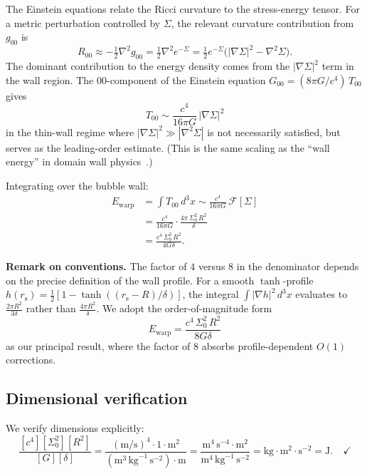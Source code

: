 \documentclass[prd,twocolumn,superscriptaddress,longbibliography]{revtex4-2}
\newcommand{\rs}{r_{\mathrm{s}}}
\newcommand{\Ewarp}{E_{\mathrm{warp}}}
\newcommand{\Fisher}{\mathcal{F}}
\begin{document}
The Einstein equations relate the Ricci curvature to the stress-energy
tensor.  For a metric perturbation controlled by $\Sigma$, the
relevant curvature contribution from $g_{00}$ is~\cite{Wald1984}
\begin{equation}
\label{eq:R00}
R_{00} \approx -\tfrac{1}{2}\nabla^2 g_{00}
= \tfrac{1}{2}\nabla^2 e^{-\Sigma}
= \tfrac{1}{2}e^{-\Sigma}\bigl(|\nabla\Sigma|^2 - \nabla^2\Sigma\bigr).
\end{equation}
The dominant contribution to the energy density comes from the
$|\nabla\Sigma|^2$ term in the wall region.  The $00$-component
of the Einstein equation $G_{00} = (8\pi G/c^4)\,T_{00}$ gives
\begin{equation}
\label{eq:T00}
T_{00} \sim \frac{c^4}{16\pi G}\,|\nabla\Sigma|^2
\end{equation}
in the thin-wall regime where $|\nabla\Sigma|^2 \gg |\nabla^2\Sigma|$
is not necessarily satisfied, but serves as the leading-order estimate.
(This is the same scaling as the ``wall energy'' in domain wall
physics~\cite{Vilenkin2000}.)

Integrating over the bubble wall:
\begin{align}
\Ewarp &= \int T_{00}\,d^3x
\sim \frac{c^4}{16\pi G}\,\Fisher[\Sigma] \nonumber\\
&= \frac{c^4}{16\pi G}\cdot\frac{4\pi\,\Sigma_0^2\,R^2}{\delta}
\nonumber\\
&= \frac{c^4\,\Sigma_0^2\,R^2}{4G\delta}.
\label{eq:Ewarp}
\end{align}

\noindent\textbf{Remark on conventions.}  The factor of $4$ versus $8$ in
the denominator depends on the precise definition of the wall profile.
For a smooth $\tanh$-profile $h(\rs) = \frac{1}{2}[1 - \tanh((\rs - R)/\delta)]$,
the integral $\int |\nabla h|^2\,d^3x$ evaluates to
$\frac{2\pi R^2}{3\delta}$ rather than $\frac{4\pi R^2}{\delta}$.
We adopt the order-of-magnitude form
\begin{equation}
\boxed{
\Ewarp = \frac{c^4\,\Sigma_0^2\,R^2}{8G\delta}
}
\label{eq:Ewarp_final}
\end{equation}
as our principal result, where the factor of $8$ absorbs profile-dependent
$O(1)$ corrections.

\subsection{Dimensional verification}

We verify dimensions explicitly:
\begin{equation}
\frac{[c^4][\Sigma_0^2][R^2]}{[G][\delta]}
= \frac{(\mathrm{m/s})^4 \cdot 1 \cdot \mathrm{m}^2}
       {(\mathrm{m}^3\,\mathrm{kg}^{-1}\,\mathrm{s}^{-2})\cdot\mathrm{m}}
= \frac{\mathrm{m}^4\,\mathrm{s}^{-4}\cdot\mathrm{m}^2}
       {\mathrm{m}^4\,\mathrm{kg}^{-1}\,\mathrm{s}^{-2}}
= \mathrm{kg}\cdot\mathrm{m}^2\cdot\mathrm{s}^{-2}
= \mathrm{J}. \quad\checkmark
\end{equation}
\end{document}
